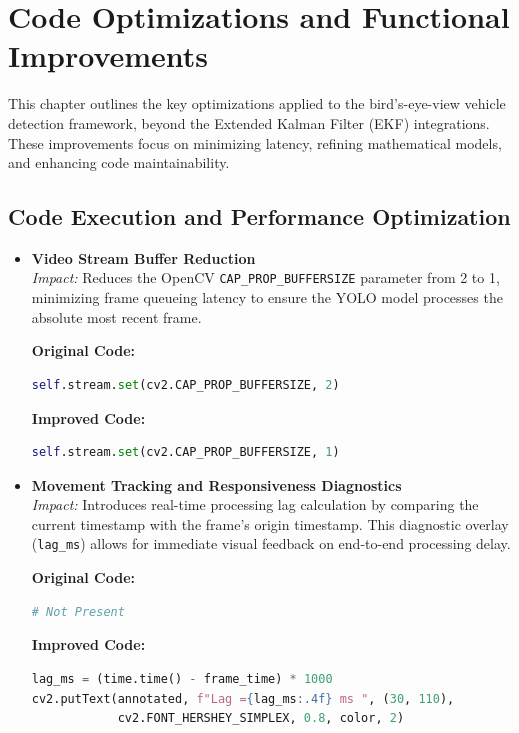 \chapter{Code Optimizations and Functional Improvements}
\label{ch:code-optimization}

This chapter outlines the key optimizations applied to the bird's-eye-view vehicle detection framework, beyond the Extended Kalman Filter (EKF) integrations. These improvements focus on minimizing latency, refining mathematical models, and enhancing code maintainability.

\section{Code Execution and Performance Optimization}

\begin{itemize}
    \item \textbf{Video Stream Buffer Reduction}\\
    \textit{Impact:} Reduces the OpenCV \texttt{CAP\_PROP\_BUFFERSIZE} parameter from 2 to 1, minimizing frame queueing latency to ensure the YOLO model processes the absolute most recent frame.
    
    \textbf{Original Code:}
    \begin{lstlisting}[language=Python]
self.stream.set(cv2.CAP_PROP_BUFFERSIZE, 2)
    \end{lstlisting}
    
    \textbf{Improved Code:}
    \begin{lstlisting}[language=Python]
self.stream.set(cv2.CAP_PROP_BUFFERSIZE, 1)
    \end{lstlisting}

    \item \textbf{Movement Tracking and Responsiveness Diagnostics}\\
    \textit{Impact:} Introduces real-time processing lag calculation by comparing the current timestamp with the frame's origin timestamp. This diagnostic overlay (\texttt{lag\_ms}) allows for immediate visual feedback on end-to-end processing delay.
    
    \textbf{Original Code:}
    \begin{lstlisting}[language=Python]
# Not Present
    \end{lstlisting}
    
    \textbf{Improved Code:}
    \begin{lstlisting}[language=Python]
lag_ms = (time.time() - frame_time) * 1000
cv2.putText(annotated, f"Lag ={lag_ms:.4f} ms ", (30, 110),
            cv2.FONT_HERSHEY_SIMPLEX, 0.8, color, 2)
    \end{lstlisting}
\end{itemize}

